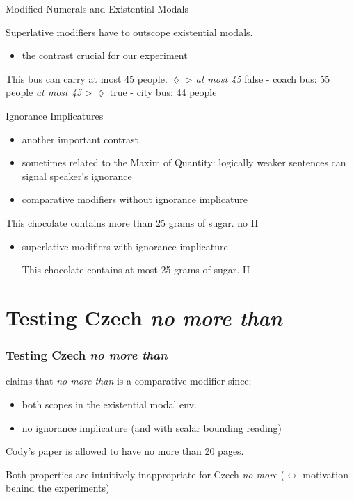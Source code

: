 \documentclass[10pt
]{beamer}
\begin{document}
\begin{frame}{Modified Numerals and Existential Modals}

  Superlative modifiers have to outscope existential modals.

  \begin{itemize}
    \item the contrast crucial for our experiment
  \end{itemize}
  
  
   \pex This bus can carry at most 45 people.
    \a *$\lozenge$ > \textit{at most 45} \hfill false - coach bus: 55 people
    \a \textit{at most 45} > $\lozenge$ \hfill true - city bus: 44 people
    \xe
  
  \footnotesize
  
  \footnotesize
  \cite{geurts2007least,blok2019scope}
  
  
  \end{frame}
  

\begin{frame}{Ignorance Implicatures}
\begin{itemize}
    \item another important contrast
    \item sometimes related to the Maxim of Quantity: logically weaker sentences can signal speaker's ignorance
    \item comparative modifiers without ignorance implicature
\end{itemize}

\ex 
This chocolate contains more than 25 grams of sugar. \hfill no II
\xe

\begin{itemize}
    \item superlative modifiers with ignorance implicature

\ex This chocolate contains at most 25 grams of sugar. \hfill II
\xe 

\end{itemize}
\end{frame}


\section{Testing Czech \textit{no more than}}

\begin{frame}
  \frametitle{Testing Czech \textit{no more than}}

  \cite{nouwen2008upper} claims that \textit{no more than} is a comparative modifier since:

  \begin{itemize}
    \item both scopes in the existential modal env.
    \item no ignorance implicature (and with scalar bounding reading)
  \end{itemize}

\ex  Cody’s paper is allowed to have no more than 20 pages.  
\xe  

Both properties are intuitively inappropriate for Czech \textit{no more} ($\leftrightarrow$ motivation behind the experiments)

\end{frame}
\end{document}
